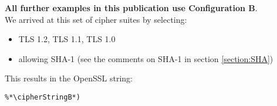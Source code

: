 \textbf{All further examples in this publication use Configuration B}.\\

We arrived at this set of cipher suites by selecting:

\begin{itemize}
  \item TLS 1.2, TLS 1.1, TLS 1.0
  \item allowing SHA-1 (see the comments on SHA-1 in section \ref{section:SHA})
\end{itemize}

This results in the OpenSSL string:

\begin{lstlisting}
%*\cipherStringB*)
\end{lstlisting}

